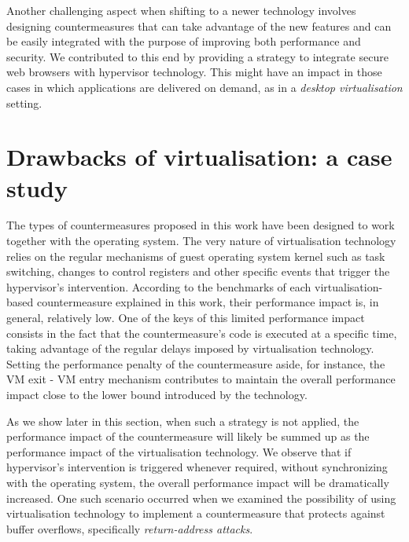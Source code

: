 Another challenging aspect when shifting to a newer technology involves designing countermeasures that can take 
advantage of the new features and can be easily integrated with the purpose of improving both performance and security. We contributed to this end by providing a strategy to integrate secure web browsers with hypervisor technology. This might have an impact in those cases in which applications are delivered on demand, as in a \emph{desktop virtualisation} setting.



\section{Drawbacks of virtualisation: a case study}\label{virt:drawback}
The types of countermeasures proposed in this work have been designed to work together with the operating system.  The very nature of virtualisation technology relies on the regular mechanisms of guest operating system kernel such as task switching, changes to control registers and other specific events that trigger the hypervisor's intervention.
According to the benchmarks of each virtualisation-based countermeasure explained in this work, their performance impact is, in general, relatively low. One of the keys of this limited performance impact consists in the fact that the countermeasure's code is executed at a specific time, taking advantage of the regular delays imposed by virtualisation technology. Setting the performance penalty of the countermeasure aside, for instance, the VM exit - VM entry mechanism contributes to maintain the overall performance impact close to the lower bound introduced by the technology. 

As we show later in this section, when such a strategy is not applied, the performance impact of the countermeasure will likely be summed up as the performance impact of the virtualisation technology. We observe that if hypervisor's intervention is triggered whenever required, without synchronizing with the operating system, the overall performance impact will be dramatically increased. One such scenario occurred when we examined the possibility of using virtualisation technology to implement a countermeasure that protects against buffer overflows, specifically \emph{return-address attacks}. 

